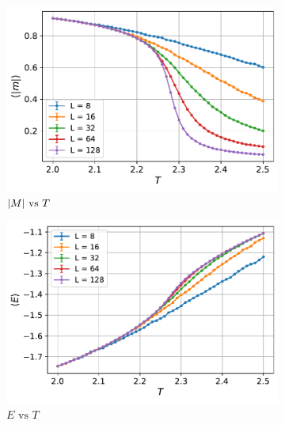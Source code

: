 \documentclass[../journal_main.tex]{subfiles}
\begin{document}
\begin{figure}[!htb]
    \centering
    \begin{subfigure}[b]{0.47\textwidth}  %
        \centering
        \includegraphics[width=\textwidth]{images/expval vs T/abs(mag).pdf}
        \caption{$\abs{M} \text{ vs } T$}
    \end{subfigure}
    \hspace{1em}  %
    \vspace{1em}
    \begin{subfigure}[b]{0.47\textwidth}
        \centering
        \includegraphics[width=\textwidth]{images/expval vs T/edens.pdf}
        \caption{$E \text{ vs } T$}
    \end{subfigure}
    \hspace{1em}  %
    \vspace{1em}
    \begin{subfigure}[b]{0.47\textwidth}

\end{subfigure}
\end{figure}
\end{document}
